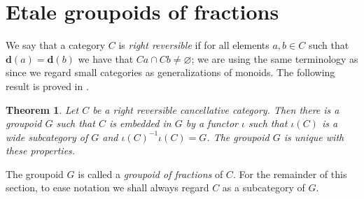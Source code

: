 \documentclass[a4paper]{amsart}
\newtheorem{theorem}{Theorem}[section]
\newtheorem{proposition}[theorem]{Proposition}
\begin{document}
\section{Etale groupoids of fractions}


We say that a category $C$ is {\em right reversible} if for all elements $a,b \in C$ such that $\mathbf{d}(a) = \mathbf{d}(b)$
we have that $Ca \cap Cb \neq \varnothing$;
we are using the same terminology as \cite{CP} since we regard small categories as generalizations of monoids.
The following result is proved in \cite{GZ}. 

\begin{theorem}\label{them:four}
Let $C$ be a right reversible cancellative category.
Then there is a groupoid $G$ such that
$C$ is embedded in $G$ by a functor $\iota$ such that
$\iota (C)$ is a wide subcategory of $G$
and 
$\iota (C)^{-1}\iota (C) = G$.
The groupoid $G$ is unique with these properties.
\end{theorem}

The groupoid $G$ is called a {\em groupoid of fractions} of $C$.
For the remainder of this section, to ease notation we shall always regard $C$ as a subcategory of $G$.


\end{document}
